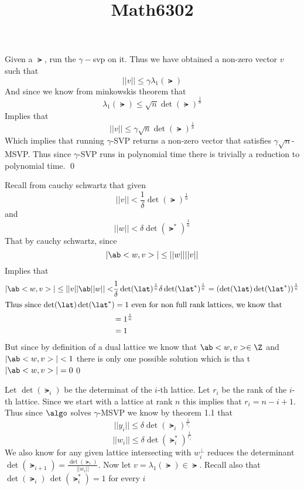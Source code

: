 \documentclass[12pt]{amsart}
\title{Math6302}
\begin{document}
  \maketitle
  \begin{problem}
    \begin{subproblem}
      Given a $\lat$, run the $\gamma-$svp on it. Thus we have obtained a non-zero vector $v$ such that 
      \[||v|| \leq \gamma \lambda_1(\lat)\]
      And since we know from minkowskis theorem that 
      \[\lambda_1(\lat) \leq \sqrt{n}\det(\lat)^{\frac1n}\]
      Implies that
      \[||v|| \leq \gamma\sqrt{n}\det(\lat)^{\frac1n}\]
      Which implies that running $\gamma$-SVP returns a non-zero vector that satisfies $\gamma\sqrt{n}$-MSVP. Thus since $\gamma$-SVP runs in polynomial time there is trivially a reduction to polynomial time. \qed
    \end{subproblem}
    \begin{subproblem}
      Recall from cauchy schwartz that given 
      \[||v||<\frac1{\delta}\det(\lat)^\frac1n\]
      and 
      \[||w||<\delta\det(\lat^*)^\frac1n\]
      That by cauchy schwartz, since 
    \[|\ab<w,v>|\leq ||w||||v||\]
      Implies that 
      \begin{align}
        |\ab<w,v>|\leq ||v||\ab||w||<& \frac1{\delta}\det(\lat)^\frac1n\delta\det(\lat^*)^\frac1n=(\det(\lat)\det(\lat^*))^{\frac1n}\\
      \intertext{Thus since $\det(\lat)\det(\lat^*)=1$ even for non full rank lattices, we know that}
                                   &= 1^\frac1n \\
                                   &= 1
      \end{align}
      But since by definition of a dual lattice we know that $\ab<w,v>\in \Z$ and $|\ab<w,v>|<1$ there is only one possible solution which is tha t $|\ab<w,v>|=0$\qed
    \end{subproblem}
    \begin{subproblem}
      Let $\det(\lat_i)$ be the determinat of the $i$-th lattice. Let $r_i$ be the rank of the $i$-th lattice. Since we start with a lattice at rank $n$ this implies that $r_i=n-i+1$. Thus since $\algo$ solves $\gamma$-MSVP we know by theorem 1.1 that 
      \[||y_i||\leq \delta\det(\lat_i)^\frac1{r_i}\]
      \[||w_i||\leq \delta\det(\lat^*_i)^\frac1{r_i}\]
      We also know for any given lattice intersecting with $w^\perp_i$ reduces the determinant $\det(\lat_{i+1})=\frac{\det(\lat_i)}{||w_i||}$. Now let $v=\lambda_1(\lat)\in \lat$. 
      Recall also that $\det(\lat_i)\,\det(\lat_i^{*}) = 1$ for every $i$ 


\end{subproblem}
\end{problem}
\end{document}
